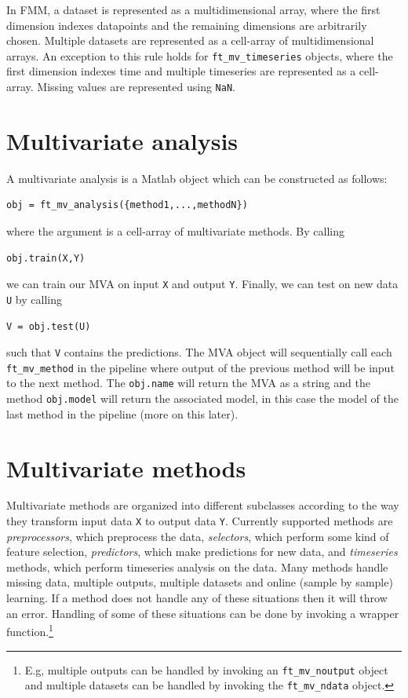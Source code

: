 \documentclass{article}
\renewcommand{\t}[1]{{\tt #1}}
\begin{document}
In FMM, a dataset is represented as a multidimensional array, where the first dimension indexes datapoints and the remaining dimensions are arbitrarily chosen. Multiple datasets are represented as a cell-array of multidimensional arrays. An exception to this rule holds for \t{ft\_mv\_timeseries} objects, where the first dimension indexes time and multiple timeseries are represented as a cell-array. Missing values are represented using \t{NaN}.

\section{Multivariate analysis}

A multivariate analysis is a Matlab object which can be constructed as follows:
\begin{verbatim}
obj = ft_mv_analysis({method1,...,methodN})
\end{verbatim}
where the argument is a cell-array of multivariate methods. By calling
\begin{verbatim}
obj.train(X,Y)
\end{verbatim}
we can train our MVA on input \t{X} and output \t{Y}. Finally, we can test on new data \t{U} by calling
\begin{verbatim}
V = obj.test(U)
\end{verbatim}
such that \t{V} contains the predictions. The MVA object will sequentially call each \t{ft\_mv\_method} in the pipeline where output of the previous method will be input to the next method. The \t{obj.name} will return the MVA as a string and the method \t{obj.model} will return the associated model, in this case the model of the last method in the pipeline (more on this later).


\section{Multivariate methods}

Multivariate methods are organized into different subclasses according to the way they transform input data \t{X} to output data \t{Y}. Currently supported methods are {\em preprocessors}, which preprocess the data, {\em selectors}, which perform some kind of feature selection, {\em predictors}, which make predictions for new data, and {\em timeseries} methods, which perform timeseries analysis on the data. Many methods handle missing data, multiple outputs, multiple datasets and online (sample by sample) learning. If a method does not handle any of these situations then it will throw an error. Handling of some of these situations can be done by invoking a wrapper function.\footnote{E.g, multiple outputs can be handled by invoking an \t{ft\_mv\_noutput} object and multiple datasets can be handled by invoking the \t{ft\_mv\_ndata} object.}
\end{document}
